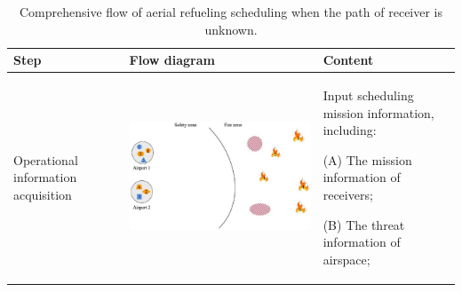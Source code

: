 \begin{table}
	\renewcommand\arraystretch{1}
	\caption{Comprehensive flow of aerial refueling scheduling when the path of receiver is unknown.}
	
	\begin{centering}
		\begin{tabular}{p{2.4cm}|p{9.3cm}|p{3.4cm}}
			\hline 
			Step & Flow diagram & Content\tabularnewline
			\hline 
			
			
			Operational information acquisition
			&\begin{adjustbox}{raise=-0.75\height}
				\includegraphics{Figures/Figs_Ch16/p1.pdf}\end{adjustbox}
			&Input scheduling mission information, including:
			
			(A) The mission information of receivers;
			
			(B) The threat information of airspace;
			

\end{tabular}
\end{centering}
\end{table}

